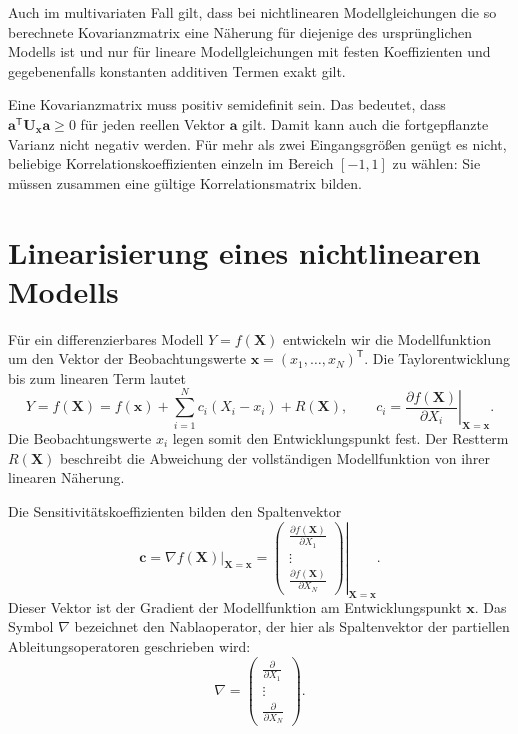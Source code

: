 Auch im multivariaten Fall gilt, dass bei nichtlinearen Modellgleichungen die so berechnete
Kovarianzmatrix eine Näherung für diejenige des ursprünglichen
Modells ist und nur für lineare Modellgleichungen mit festen Koeffizienten
und gegebenenfalls konstanten additiven Termen exakt gilt.

Eine Kovarianzmatrix muss positiv semidefinit sein. Das bedeutet,
dass $\mathbf a^\mathsf T\mathbf U_{\mathbf x}\mathbf a\geq0$
für jeden reellen Vektor $\mathbf a$ gilt. Damit kann auch die
fortgepflanzte Varianz nicht negativ werden.
Für mehr als zwei Eingangsgrößen genügt es nicht, beliebige
Korrelationskoeffizienten einzeln im Bereich $[-1,1]$ zu wählen:
Sie müssen zusammen eine gültige Korrelationsmatrix bilden.


\section{Linearisierung eines nichtlinearen Modells}

Für ein differenzierbares Modell $Y=f(\mathbf X)$ entwickeln
wir die Modellfunktion um den Vektor der Beobachtungswerte
$\mathbf x=(x_1,\dots,x_N)^\mathsf T$. Die Taylorentwicklung
bis zum linearen Term lautet
\begin{equation}
Y=f(\mathbf X)
=
f(\mathbf x)
+\sum_{i=1}^N c_i(X_i-x_i)
+R(\mathbf X),
\qquad
c_i=
\left.
\frac{\partial f(\mathbf X)}{\partial X_i}
\right|_{\mathbf X=\mathbf x}.
\label{linearisiertesModellY}
\end{equation}
Die Beobachtungswerte $x_i$ legen somit den Entwicklungspunkt
fest. Der Restterm $R(\mathbf X)$ beschreibt die Abweichung
der vollständigen Modellfunktion von ihrer linearen Näherung.

Die Sensitivitätskoeffizienten bilden den Spaltenvektor
\begin{equation}
\mathbf c
=
\left.\nabla f(\mathbf X)\right|_{\mathbf X=\mathbf x}
=
\left.
\begin{pmatrix}
\frac{\partial f(\mathbf X)}{\partial X_1}\\
\vdots\\
\frac{\partial f(\mathbf X)}{\partial X_N}
\end{pmatrix}
\right|_{\mathbf X=\mathbf x}.
\end{equation}
Dieser Vektor ist der Gradient der Modellfunktion am
Entwicklungspunkt $\mathbf x$. Das Symbol $\nabla$ bezeichnet
den Nablaoperator, der hier als Spaltenvektor der partiellen
Ableitungsoperatoren geschrieben wird:
\begin{equation}
\nabla=
\begin{pmatrix}
\frac{\partial}{\partial X_1}\\
\vdots\\
\frac{\partial}{\partial X_N}
\end{pmatrix}.
\end{equation}

